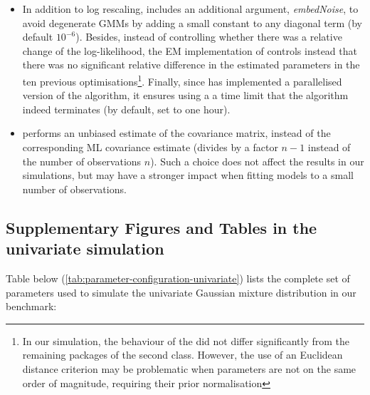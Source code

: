 \begin{itemize}
\item
  In addition to log rescaling,  includes an additional argument, \emph{embedNoise}, to avoid degenerate GMMs by adding a small constant to any diagonal term (by default \(10^{-6}\)). Besides, instead of controlling whether there was a relative change of the log-likelihood, the EM implementation of  controls instead that there was no significant relative difference in the estimated parameters in the ten previous optimisations\footnote{In our simulation, the behaviour of the  did not differ significantly from the remaining packages of the second class. However, the use of an Euclidean distance criterion may be problematic when parameters are not on the same order of magnitude, requiring their prior normalisation}. Finally, since  has implemented a parallelised version of the algorithm, it ensures using a a time limit that the algorithm indeed terminates (by default, set to one hour).
\item
   performs an unbiased estimate of the covariance matrix, instead of the corresponding ML covariance estimate (divides by a factor \(n-1\) instead of the number of observations \(n\)). Such a choice does not affect the results in our simulations, but may have a stronger impact when fitting models to a small number of observations.
\end{itemize}

\newpage

\hypertarget{supplementary-figures-and-tables-in-the-univariate-simulation}{%
\subsection{Supplementary Figures and Tables in the univariate simulation}\label{supplementary-figures-and-tables-in-the-univariate-simulation}}

Table below (\ref{tab:parameter-configuration-univariate}) lists the complete set of parameters used to simulate the univariate Gaussian mixture distribution in our benchmark:

